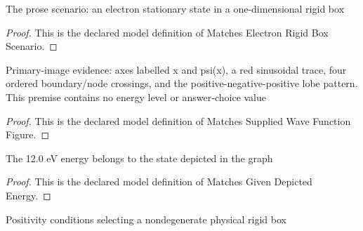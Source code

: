 \begin{definition}
  \label{def:physics:phyx-mini-0657:phyxminiproblems-problemphyxmini0657-matcheselectronrigidboxscenario}
  The prose scenario: an electron stationary state in a one-dimensional rigid box
\end{definition}
\begin{proof}
  This is the declared model definition of Matches Electron Rigid Box Scenario.
\end{proof}
\begin{definition}
  \label{def:physics:phyx-mini-0657:phyxminiproblems-problemphyxmini0657-matchessuppliedwavefunctionfigure}
  Primary-image evidence: axes labelled x and psi(x), a red sinusoidal trace, four ordered boundary/node crossings, and the positive-negative-positive lobe pattern. This premise contains no energy level or answer-choice value
\end{definition}
\begin{proof}
  This is the declared model definition of Matches Supplied Wave Function Figure.
\end{proof}
\begin{definition}
  \label{def:physics:phyx-mini-0657:phyxminiproblems-problemphyxmini0657-matchesgivendepictedenergy}
  The 12.0 eV energy belongs to the state depicted in the graph
\end{definition}
\begin{proof}
  This is the declared model definition of Matches Given Depicted Energy.
\end{proof}
\begin{definition}
  \label{def:physics:phyx-mini-0657:phyxminiproblems-problemphyxmini0657-hasphysicalrigidboxparameters}
  Positivity conditions selecting a nondegenerate physical rigid box
\end{definition}

